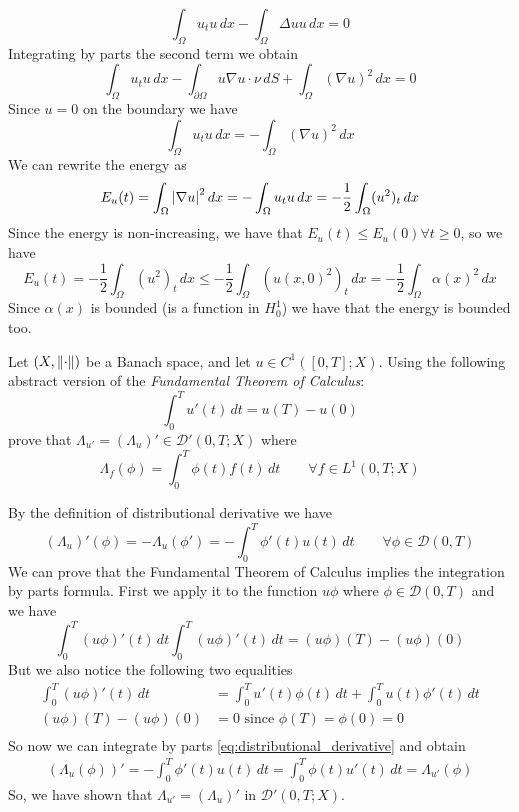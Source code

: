 \[
    \int_\Omega u_t u \, dx - \int_\Omega \Delta u u \, dx = 0
\]
Integrating by parts the second term we obtain
\[
    \int_\Omega u_t u \, dx - \int_{\partial\Omega} u \nabla u \cdot \nu \, dS + \int_\Omega (\nabla u)^2 \, dx = 0
\]
Since \(u = 0\) on the boundary we have
\[
    \int_\Omega u_t u \, dx = - \int_\Omega (\nabla u)^2 \, dx
\]
We can rewrite the energy as
\[
    E_u(t) = \int_\Omega \abs{\nabla u}^2 \, dx = - \int_\Omega u_t u \, dx = - \frac{1}{2} \int_\Omega (u^2)_t \, dx
\]
Since the energy is non-increasing, we have that \(E_u(t) \leq E_u(0) \forall t
\geq 0\), so we have
\[
    E_u(t) = - \frac{1}{2} \int_\Omega (u^2)_t \, dx \leq - \frac{1}{2} \int_\Omega (u(x, 0)^2)_t \, dx = - \frac{1}{2} \int_\Omega \alpha(x)^2 \, dx
\]
Since \(\alpha(x)\) is bounded (is a function in \(H^1_0\)) we have that the
energy is bounded too.

\newpage
\begin{exercise}
    Let \((X, \norm{\cdot})\) be a Banach space, and let \(u \in C^1([0, T]; X)\). Using the following abstract version of the \textit{Fundamental Theorem of Calculus}:
    \[
        \int_0^T u'(t) \, dt = u(T) - u(0)
    \]
    prove that \(\Lambda_{u'} = (\Lambda_u)' \in \mathcal{D}'(0, T; X)\) where
    \[
        \Lambda_f(\phi) = \int_0^T \phi(t) f(t) \, dt \qquad \forall f \in L^1(0, T; X)
    \]
\end{exercise}

By the definition of distributional derivative we have
\begin{equation} \label{eq:distributional_derivative}
    (\Lambda_u)'(\phi) = - \Lambda_u(\phi') =  - \int_0^T \phi'(t) u(t) \, dt \qquad \forall \phi \in \mathcal{D}(0, T)
\end{equation}
We can prove that the Fundamental Theorem of Calculus implies the integration by parts formula.
First we apply it to the function \(u \phi\) where \(\phi \in \mathcal{D}(0, T)\) and we have
\begin{equation*}
    \int_0^T (u\phi)'(t) \, dt \int_0^T (u\phi)'(t) \, dt = (u \phi) (T) - (u \phi) (0)
\end{equation*}
But we also notice the following two equalities
\[
    \begin{split}
        \int_0^T (u\phi)'(t) \, dt  & = \int_0^T u'(t) \phi(t) \, dt + \int_0^T u(t) \phi'(t) \, dt \\
        (u \phi) (T) - (u \phi) (0) & = 0 \text{ since } \phi(T) = \phi(0) = 0                      \\
    \end{split}
\]
So now we can integrate by parts \eqref{eq:distributional_derivative} and
obtain
\[
    \begin{split}
        (\Lambda_u(\phi))' = - \int_0^T \phi'(t) u(t) \, dt = \int_0^T \phi(t) u'(t) \, dt = \Lambda_{u'}(\phi)
    \end{split}
\]
So, we have shown that \(\Lambda_{u'} = (\Lambda_u)'\) in \(\mathcal{D}'(0, T;
X)\).

